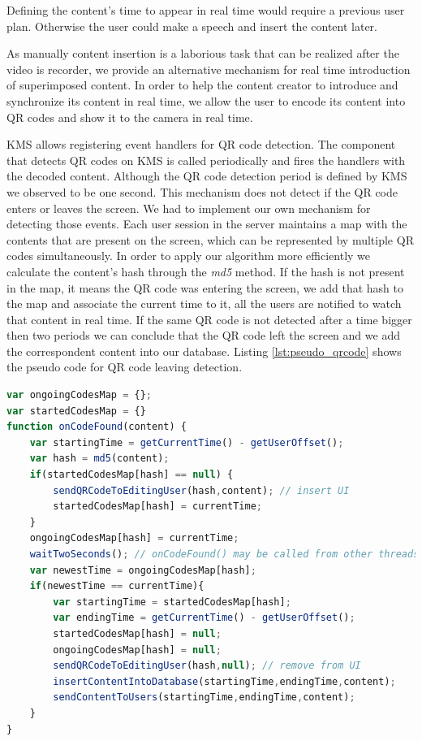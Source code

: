 	Defining the content's time to appear in real time would require a previous user plan. Otherwise the user could make a speech and insert the content later.


	As manually content insertion is a laborious task that can be realized after the video is recorder, we provide an alternative mechanism for real time introduction of superimposed content.	In order to help the content creator to introduce and synchronize its content in real time, we allow the user to encode its content into \ac{QR} codes and show it to the camera in real time.

	\ac{KMS} allows registering event handlers for \ac{QR} code detection. The component that detects \ac{QR} codes on \ac{KMS} is called periodically and fires the handlers with the decoded content. Although the \ac{QR} code detection period is defined by \ac{KMS} we observed to be one second. This mechanism does not detect if the \ac{QR} code enters or leaves the screen. We had to implement our own mechanism for detecting those events. Each user session in the server maintains a map with the contents that are present on the screen, which can be represented by multiple \ac{QR} codes simultaneously. In order to apply our algorithm more efficiently we calculate the content's hash through the \emph{md5} method. If the hash is not present in the map, it means the \ac{QR} code was entering the screen, we add that hash to the map and associate the current time to it, all the users are notified to watch that content in real time. If the same \ac{QR} code is not detected after a time bigger then two periods we can conclude that the \ac{QR} code left the screen and we add the correspondent content into our database. Listing \ref{lst:pseudo_qrcode} shows the pseudo code for \ac{QR} code leaving detection.

\begin{minipage}{\linewidth}
\begin{lstlisting}[caption={Pseudo code for QR code leaving detection},label={lst:pseudo_qrcode},language=JavaScript]
var ongoingCodesMap = {};
var startedCodesMap = {}
function onCodeFound(content) {
	var startingTime = getCurrentTime() - getUserOffset();
	var hash = md5(content);
	if(startedCodesMap[hash] == null) {
		sendQRCodeToEditingUser(hash,content); // insert UI
		startedCodesMap[hash] = currentTime;
	}
	ongoingCodesMap[hash] = currentTime;
	waitTwoSeconds(); // onCodeFound() may be called from other threads
	var newestTime = ongoingCodesMap[hash]; 
	if(newestTime == currentTime){
		var startingTime = startedCodesMap[hash];
		var endingTime = getCurrentTime() - getUserOffset();
		startedCodesMap[hash] = null; 
		ongoingCodesMap[hash] = null; 
		sendQRCodeToEditingUser(hash,null); // remove from UI
		insertContentIntoDatabase(startingTime,endingTime,content);
		sendContentToUsers(startingTime,endingTime,content);
	}
}
\end{lstlisting}
\end{minipage}


